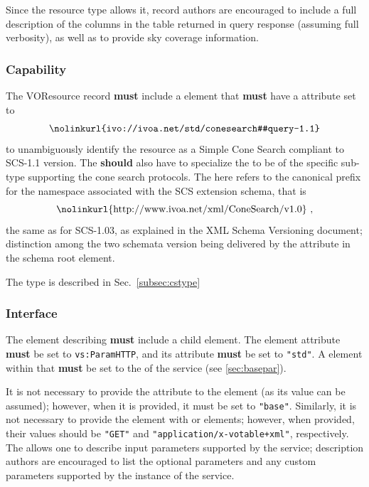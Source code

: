 \documentclass[11pt,a4paper]{ivoa}
\begin{document}
Since the  resource type allows it, record authors are encouraged to include a full description of the columns in the table returned in query response (assuming full verbosity), as well as to provide sky coverage information.

\subsubsection{Capability}
\label{subsec:capability}
The VOResource record \textbf{must} include a  element that \textbf{must} have a  attribute set to
$$\hbox{\nolinkurl{ivo://ivoa.net/std/conesearch#query-1.1}}$$
to unambiguously identify the resource as a Simple Cone Search compliant to SCS-1.1 version. The  \textbf{should} also have  to specialize the  to be of the specific sub-type supporting the cone search protocols. The  here refers to the canonical prefix for the namespace associated with the SCS extension schema, that is
$$\hbox{\nolinkurl{http://www.ivoa.net/xml/ConeSearch/v1.0} ,}$$
the same as for SCS-1.03, as explained in the XML Schema Versioning \citep{note:schemaversioning} document; distinction among the two schemata version being delivered by the  attribute in the schema root element.

The  type is described in Sec.~\ref{subsec:cstype}

\subsubsection{Interface}
The  element describing \textbf{must} include a child  element.
The  element  attribute \textbf{must} be set to \texttt{vs:ParamHTTP}, and its  attribute \textbf{must} be set to \texttt{"std"}. A  element within that
 \textbf{must} be set to the  of the service (see \ref{sec:basepar}). 

It is not necessary to provide the  attribute to the
 element (as its value can be assumed); however, when
it is provided, it must be set to \texttt{"base"}. Similarly, it is not
necessary to provide the  element with
 or  elements; however, when
provided, their values should be \texttt{"GET"} and
\texttt{"application/x-votable+xml"}, respectively. The
 allows one to describe input parameters supported
by the service; description authors are encouraged to list the optional
parameters and any custom parameters supported by the instance of the
service.  
\end{document}

